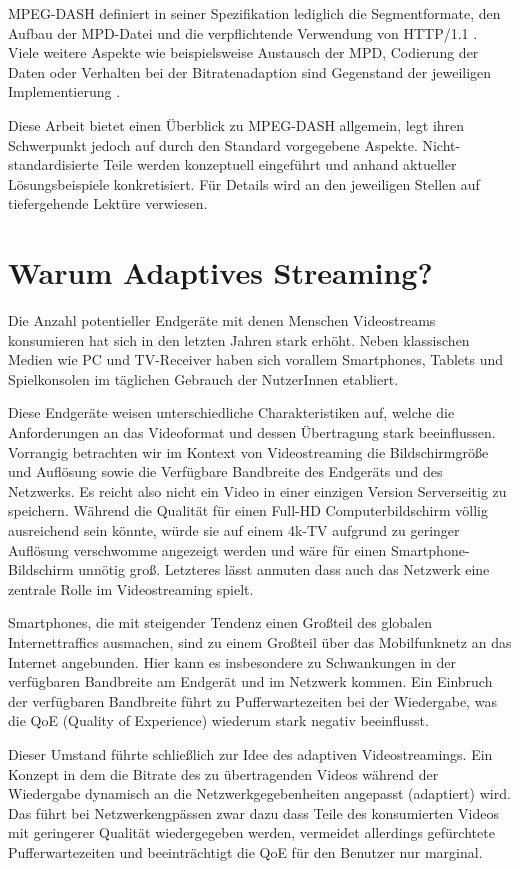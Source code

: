 \documentclass[paper = a4, fontsize = 12pt, parskip = half]{scrartcl} %
\begin{document}
MPEG-DASH definiert in seiner Spezifikation lediglich die Segmentformate, den Aufbau der MPD-Datei und die verpflichtende Verwendung von HTTP/1.1 \cite{mpeg_dynamic_2013}. Viele weitere Aspekte wie beispielsweise Austausch der MPD, Codierung der Daten oder Verhalten bei der Bitratenadaption sind Gegenstand der jeweiligen Implementierung \cite{sodagar_mpeg-dash_2011}.

Diese Arbeit bietet einen Überblick zu MPEG-DASH allgemein, legt ihren Schwerpunkt jedoch auf durch den Standard vorgegebene Aspekte.
Nicht-standardisierte Teile werden konzeptuell eingeführt und anhand aktueller Lösungsbeispiele konkretisiert. Für Details wird an den jeweiligen Stellen auf tiefergehende Lektüre verwiesen.

\section{Warum Adaptives Streaming?}
Die Anzahl potentieller Endgeräte mit denen Menschen Videostreams konsumieren hat sich in den letzten Jahren stark erhöht. Neben klassischen Medien wie PC und TV-Receiver haben sich vorallem Smartphones, Tablets und Spielkonsolen im täglichen Gebrauch der NutzerInnen etabliert.

Diese Endgeräte weisen unterschiedliche Charakteristiken auf, welche die Anforderungen an das Videoformat und dessen Übertragung stark beeinflussen. Vorrangig betrachten wir im Kontext von Videostreaming die Bildschirmgröße und Auflösung sowie die Verfügbare Bandbreite des Endgeräts und des Netzwerks.
Es reicht also nicht ein Video in einer einzigen Version Serverseitig zu speichern. Während die Qualität für einen Full-HD Computerbildschirm völlig ausreichend sein könnte, würde sie auf einem 4k-TV aufgrund zu geringer Auflösung verschwomme angezeigt werden und wäre für einen Smartphone-Bildschirm unnötig groß. Letzteres lässt anmuten dass auch das Netzwerk eine zentrale Rolle im Videostreaming spielt.

Smartphones, die mit steigender Tendenz einen Großteil des globalen Internettraffics ausmachen, sind zu einem Großteil über das Mobilfunknetz an das Internet angebunden. Hier kann es insbesondere zu Schwankungen in der verfügbaren Bandbreite am Endgerät und im Netzwerk kommen. Ein Einbruch der verfügbaren Bandbreite führt zu Pufferwartezeiten bei der Wiedergabe, was die QoE (Quality of Experience) wiederum stark negativ beeinflusst.

Dieser Umstand führte schließlich zur Idee des adaptiven Videostreamings. Ein Konzept in dem die Bitrate des zu übertragenden Videos während der Wiedergabe dynamisch an die Netzwerkgegebenheiten angepasst (adaptiert) wird. Das führt bei Netzwerkengpässen zwar dazu dass Teile des konsumierten Videos mit geringerer Qualität wiedergegeben werden, vermeidet allerdings gefürchtete Pufferwartezeiten und beeinträchtigt die QoE für den Benutzer nur marginal.
\end{document}
